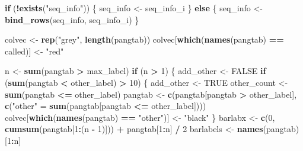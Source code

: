 \documentclass[
]{article}
\newenvironment{Shaded}{\begin{snugshade}}{\end{snugshade}}
\newcommand{\ControlFlowTok}[1]{\textcolor[rgb]{0.13,0.29,0.53}{\textbf{#1}}}
\newcommand{\DecValTok}[1]{\textcolor[rgb]{0.00,0.00,0.81}{#1}}
\newcommand{\KeywordTok}[1]{\textcolor[rgb]{0.13,0.29,0.53}{\textbf{#1}}}
\newcommand{\NormalTok}[1]{#1}
\newcommand{\OperatorTok}[1]{\textcolor[rgb]{0.81,0.36,0.00}{\textbf{#1}}}
\newcommand{\OtherTok}[1]{\textcolor[rgb]{0.56,0.35,0.01}{#1}}
\newcommand{\StringTok}[1]{\textcolor[rgb]{0.31,0.60,0.02}{#1}}
\begin{document}
\begin{Shaded}
\begin{Highlighting}[]
    \ControlFlowTok{if}\NormalTok{ (}\OperatorTok{!}\KeywordTok{exists}\NormalTok{(}\StringTok{"seq\_info"}\NormalTok{)) \{}
\NormalTok{        seq\_info \textless{}{-}}\StringTok{ }\NormalTok{seq\_info\_i}
\NormalTok{    \} }\ControlFlowTok{else}\NormalTok{ \{}
\NormalTok{        seq\_info \textless{}{-}}\StringTok{ }\KeywordTok{bind\_rows}\NormalTok{(seq\_info, seq\_info\_i)}
\NormalTok{    \}}

\NormalTok{    colvec \textless{}{-}}\StringTok{ }\KeywordTok{rep}\NormalTok{(}\StringTok{"grey"}\NormalTok{, }\KeywordTok{length}\NormalTok{(pangtab))}
\NormalTok{    colvec[}\KeywordTok{which}\NormalTok{(}\KeywordTok{names}\NormalTok{(pangtab) }\OperatorTok{==}\StringTok{ }\NormalTok{called)] \textless{}{-}}\StringTok{ "red"}

\NormalTok{    n \textless{}{-}}\StringTok{ }\KeywordTok{sum}\NormalTok{(pangtab }\OperatorTok{\textgreater{}}\StringTok{ }\NormalTok{max\_label)}
    \ControlFlowTok{if}\NormalTok{ (n }\OperatorTok{\textgreater{}}\StringTok{ }\DecValTok{1}\NormalTok{) \{}
\NormalTok{        add\_other \textless{}{-}}\StringTok{ }\OtherTok{FALSE}
        \ControlFlowTok{if}\NormalTok{ (}\KeywordTok{sum}\NormalTok{(pangtab }\OperatorTok{\textless{}}\StringTok{ }\NormalTok{other\_label) }\OperatorTok{\textgreater{}}\StringTok{ }\DecValTok{10}\NormalTok{) \{}
\NormalTok{            add\_other \textless{}{-}}\StringTok{ }\OtherTok{TRUE}
\NormalTok{            other\_count \textless{}{-}}\StringTok{ }\KeywordTok{sum}\NormalTok{(pangtab }\OperatorTok{\textless{}=}\StringTok{ }\NormalTok{other\_label)}
\NormalTok{            pangtab \textless{}{-}}\StringTok{ }\KeywordTok{c}\NormalTok{(pangtab[pangtab }\OperatorTok{\textgreater{}}\StringTok{ }\NormalTok{other\_label],}
                \KeywordTok{c}\NormalTok{(}\StringTok{"other"}\NormalTok{ =}\StringTok{ }\KeywordTok{sum}\NormalTok{(pangtab[pangtab }\OperatorTok{\textless{}=}\StringTok{ }\NormalTok{other\_label])))}
\NormalTok{            colvec[}\KeywordTok{which}\NormalTok{(}\KeywordTok{names}\NormalTok{(pangtab) }\OperatorTok{==}\StringTok{ "other"}\NormalTok{)] \textless{}{-}}\StringTok{ "black"}
\NormalTok{        \}}
\NormalTok{        barlabx \textless{}{-}}\StringTok{ }\KeywordTok{c}\NormalTok{(}\DecValTok{0}\NormalTok{, }\KeywordTok{cumsum}\NormalTok{(pangtab[}\DecValTok{1}\OperatorTok{:}\NormalTok{(n }\OperatorTok{{-}}\StringTok{ }\DecValTok{1}\NormalTok{)])) }\OperatorTok{+}
\StringTok{            }\NormalTok{pangtab[}\DecValTok{1}\OperatorTok{:}\NormalTok{n] }\OperatorTok{/}\StringTok{ }\DecValTok{2}
\NormalTok{        barlabels \textless{}{-}}\StringTok{ }\KeywordTok{names}\NormalTok{(pangtab)[}\DecValTok{1}\OperatorTok{:}\NormalTok{n]}

\end{Highlighting}
\end{Shaded}
\end{document}
